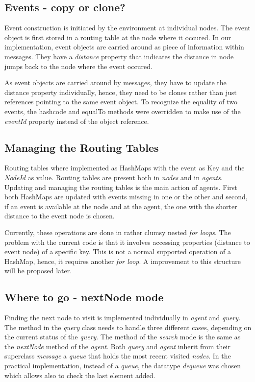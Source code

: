 \documentclass[a4paper,11pt,twoside]{article}
\begin{document}
\subsection{Events - copy or clone?}
Event construction is initiated by the environment at individual
nodes. The event object is first stored in a routing table at the
node where it occured. In our implementation, event objects are
carried around as piece of information within messages. They have a
\textit{distance} property that indicates the distance in node jumps
back to the node where the event occured.

As event objects are carried around by messages, they have to update
the distance property individually, hence, they need to be clones rather than
just references pointing to the same event object. To recognize the
equality of two events, the hashcode and equalTo methods were
overridden to make use of the \textit{eventId} property instead of the
object reference.

\subsection{Managing the Routing Tables}
Routing tables where implemented as HashMaps with the event as Key and
the \textit{NodeId} as value. Routing tables are present both in \textit{nodes}
and in \textit{agents}. Updating and managing the routing tables
is the main action of agents. First both HashMaps are updated with
events missing in one or the other and second, if an event is
available at the node and at the agent, the one with the shorter
distance to the event node is chosen.

Currently, these operations are done in rather clumsy nested
\textit{for loops}. The problem with the current code is that it involves
accessing properties (distance to event node) of a specific key. This
is not a normal supported operation of a HashMap, hence, it requires
another \textit{for loop}. A improvement to this structure will be
proposed later. 


\subsection{Where to go - nextNode mode}
Finding the next node to visit is implemented individually in 
\textit{agent} and \textit{query}. The method in the \textit{query}
class needs to handle three different cases, depending on the current
status of the \textit{query}. The method of the \textit{search} mode
is the same as the \textit{nextNode} method of the
\textit{agent}. Both \textit{query} and \textit{agent} inherit from 
their superclass \textit{message} a \textit{queue} that holds the most
recent visited \textit{nodes}. In the practical implementation,
instead of a \textit{queue}, the  datatype \textit{dequeue} was chosen
which allows also to check the last element added.
\end{document}

